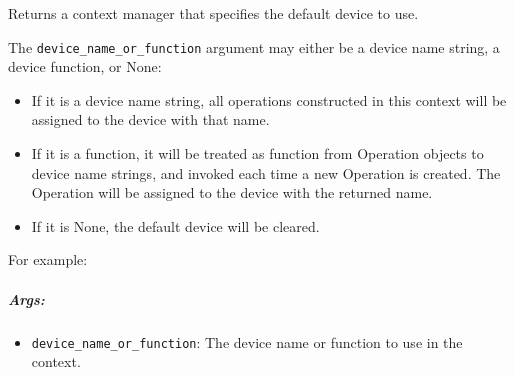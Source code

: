 Returns a context manager that specifies the default device to use.

The \lstinline{device_name_or_function} argument may either be a device
name string, a device function, or None:

\begin{itemize}
\tightlist
\item
  If it is a device name string, all operations constructed in this
  context will be assigned to the device with that name.
\item
  If it is a function, it will be treated as function from Operation
  objects to device name strings, and invoked each time a new Operation
  is created. The Operation will be assigned to the device with the
  returned name.
\item
  If it is None, the default device will be cleared.
\end{itemize}

For example:

\begin{Shaded}
\begin{Highlighting}[]
 \NormalTok{):}
   \NormalTok{):}

 
    \OperatorTok{==} \NormalTok{:}
     
  \NormalTok{:}
     

 
\end{Highlighting}
\end{Shaded}

\subparagraph{Args: }\label{args-2}

\begin{itemize}
\tightlist
\item
  \lstinline{device_name_or_function}: The device name or function to
  use in the context.
\end{itemize}

